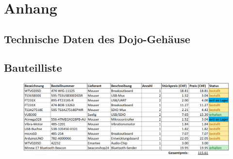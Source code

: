 \chapter*{Anhang}
\thispagestyle{fancy}  
\section*{Technische Daten des Dojo-Gehäuse}
\begin{figure}[ht]
	\label{fig:dojo_gehaeuse}
\end{figure}
\newpage

\begin{landscape}
\section*{Bauteilliste}
\vspace*{1.5cm}
\begin{figure}[h]
\centering
\includegraphics[scale=0.9]{Bilder/bauteilliste.png}
\label{fig:bauteilliste}
\end{figure}
\end{landscape}